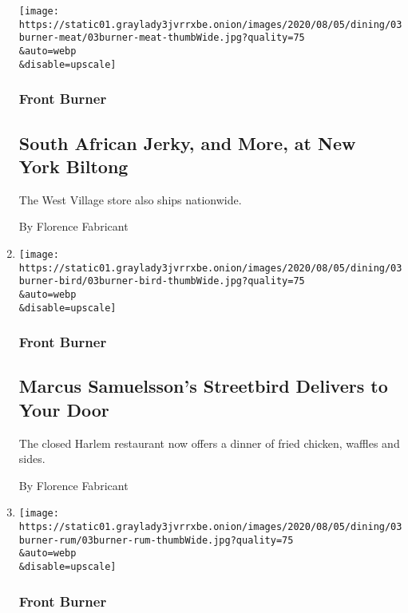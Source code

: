 \begin{enumerate}
  \texttt{[image: https://static01.graylady3jvrrxbe.onion/images/2020/08/05/dining/03burner-meat/03burner-meat-thumbWide.jpg?quality=75\\\&auto=webp\\\&disable=upscale]}

  \hypertarget{front-burner-3}{%
  \subsubsection{Front Burner}\label{front-burner-3}}

  \hypertarget{south-african-jerky-and-more-at-new-york-biltong}{%
  \subsection{South African Jerky, and More, at New York
  Biltong}\label{south-african-jerky-and-more-at-new-york-biltong}}

  The West Village store also ships nationwide.

  By Florence Fabricant
\item
  \href{/2020/08/03/dining/marcus-samuelsson-fried-chicken-delivery.html}{}

  \texttt{[image: https://static01.graylady3jvrrxbe.onion/images/2020/08/05/dining/03burner-bird/03burner-bird-thumbWide.jpg?quality=75\\\&auto=webp\\\&disable=upscale]}

  \hypertarget{front-burner-4}{%
  \subsubsection{Front Burner}\label{front-burner-4}}

  \hypertarget{marcus-samuelssons-streetbird-delivers-to-your-door}{%
  \subsection{Marcus Samuelsson's Streetbird Delivers to Your
  Door}\label{marcus-samuelssons-streetbird-delivers-to-your-door}}

  The closed Harlem restaurant now offers a dinner of fried chicken,
  waffles and sides.

  By Florence Fabricant
\item
  \href{/2020/08/03/dining/drinks/santa-teresa-rum.html}{}

  \texttt{[image: https://static01.graylady3jvrrxbe.onion/images/2020/08/05/dining/03burner-rum/03burner-rum-thumbWide.jpg?quality=75\\\&auto=webp\\\&disable=upscale]}

  \hypertarget{front-burner-5}{%
  \subsubsection{Front Burner}\label{front-burner-5}}


\end{enumerate}
